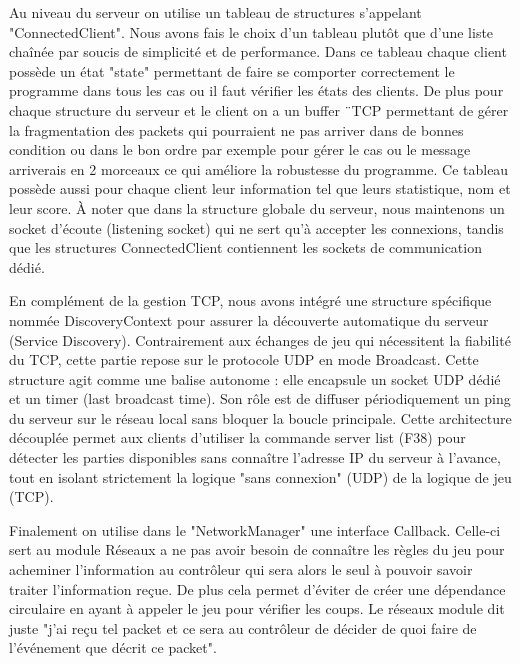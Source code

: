\documentclass[12pt,a4paper,titlepage,oneside]{article}
\begin{document}
        
        Au niveau du serveur on utilise un tableau de structures s’appelant "ConnectedClient". Nous avons fais le choix d'un tableau plutôt que d'une liste chaînée par soucis de simplicité et de performance. Dans ce tableau chaque client possède un état "state" permettant de faire se comporter correctement le programme dans tous les cas ou il faut vérifier les états des clients. De plus pour chaque structure du serveur et le client  on a un buffer ¨TCP permettant de gérer la fragmentation des packets qui pourraient ne pas arriver dans de bonnes condition ou dans le bon ordre par exemple pour gérer le cas ou le message arriverais en 2 morceaux ce qui améliore la robustesse du programme. Ce tableau possède aussi pour chaque client leur information tel que leurs statistique, nom et leur score.
        À noter que dans la structure globale du serveur, nous maintenons un socket d'écoute (listening socket) qui ne sert qu'à accepter les connexions, tandis que les structures ConnectedClient contiennent les sockets de communication dédié.\newline

        
        En complément de la gestion TCP, nous avons intégré une structure spécifique nommée DiscoveryContext pour assurer la découverte automatique du serveur (Service Discovery). Contrairement aux échanges de jeu qui nécessitent la fiabilité du TCP, cette partie repose sur le protocole UDP en mode Broadcast. Cette structure agit comme une balise autonome : elle encapsule un socket UDP dédié et un timer (last broadcast time). Son rôle est de diffuser périodiquement un ping du serveur sur le réseau local sans bloquer la boucle principale. Cette architecture découplée permet aux clients d'utiliser la commande server list (F38) pour détecter les parties disponibles sans connaître l'adresse IP du serveur à l'avance, tout en isolant strictement la logique "sans connexion" (UDP) de la logique de jeu (TCP).\newline

        
        Finalement on utilise dans le "NetworkManager" une interface Callback. Celle-ci sert au module Réseaux a ne pas avoir besoin de connaître les règles du jeu pour acheminer l'information au contrôleur qui sera alors le seul à pouvoir savoir traiter l'information reçue. De plus cela permet d’éviter de créer une dépendance circulaire en ayant à appeler le jeu pour vérifier les coups. Le réseaux module dit juste "j'ai reçu tel packet et ce sera au contrôleur de décider de quoi faire de l’événement que décrit ce packet".
\end{document}
